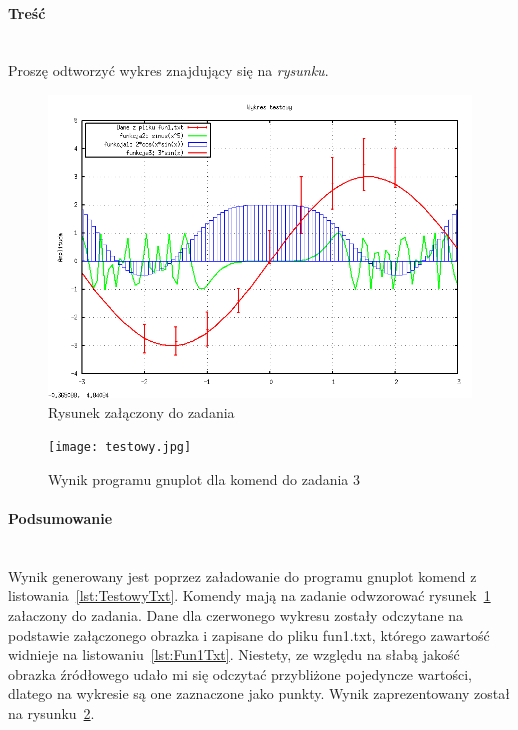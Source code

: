 \paragraph{Treść}~\\
Proszę odtworzyć wykres znajdujący się na \textit{rysunku}.

\begin{figure}[p]
  \caption{Rysunek załączony do zadania}
  \label{fig:TestowyPng}
  \centering
  \includegraphics[width=\textwidth]{testowy.png}
\end{figure}





\begin{figure}[p]
  \caption{Wynik programu gnuplot dla komend do zadania 3}
  \label{fig:TestowyJpg}
  \centering
  \texttt{[image: testowy.jpg]}
\end{figure}

\paragraph{Podsumowanie}~\\
Wynik generowany jest poprzez załadowanie do programu gnuplot komend z listowania~\ref{lst:TestowyTxt}.
Komendy mają na zadanie odwzorować rysunek~\ref{fig:TestowyPng} załaczony do zadania.
Dane dla czerwonego wykresu zostały odczytane na podstawie załączonego obrazka i zapisane do pliku fun1.txt, którego zawartość widnieje na listowaniu~\ref{lst:Fun1Txt}.
Niestety, ze względu na słabą jakość obrazka źródłowego udało mi się odczytać przybliżone pojedyncze wartości, dlatego na wykresie są one zaznaczone jako punkty.
Wynik zaprezentowany został na rysunku~\ref{fig:TestowyJpg}.
